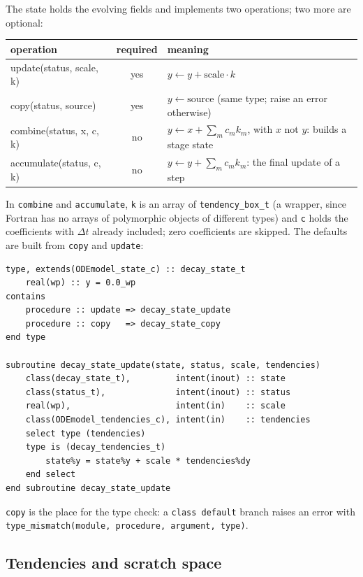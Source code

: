 \documentclass[11pt,a4paper]{article}
\newcommand{\dt}{\Delta t}
\newcommand{\code}[1]{\texttt{#1}}
\begin{document}
The state holds the evolving fields and implements two operations; two
more are optional:
\begin{center}
\renewcommand{\arraystretch}{1.25}
\begin{tabular}{>{\ttfamily}l c p{7.2cm}}
  \toprule
  \normalfont operation & required & meaning \\
  \midrule
  update(status, scale, k)       & yes & $y \leftarrow y + \text{scale}\cdot k$ \\
  copy(status, source)           & yes & $y \leftarrow \text{source}$ (same type; raise an error otherwise) \\
  combine(status, x, c, k)       & no  & $y \leftarrow x + \sum_m c_m k_m$, with $x$ not $y$: builds a stage state \\
  accumulate(status, c, k)       & no  & $y \leftarrow y + \sum_m c_m k_m$: the final update of a step \\
  \bottomrule
\end{tabular}
\end{center}
In \code{combine} and \code{accumulate}, \code{k} is an array of
\code{tendency\_box\_t} (a wrapper, since Fortran has no arrays of
polymorphic objects of different types) and \code{c} holds the coefficients
with $\dt$ already included; zero coefficients are skipped. The defaults are
built from \code{copy} and \code{update}:
\begin{lstlisting}
type, extends(ODEmodel_state_c) :: decay_state_t
    real(wp) :: y = 0.0_wp
contains
    procedure :: update => decay_state_update
    procedure :: copy   => decay_state_copy
end type

subroutine decay_state_update(state, status, scale, tendencies)
    class(decay_state_t),         intent(inout) :: state
    class(status_t),              intent(inout) :: status
    real(wp),                     intent(in)    :: scale
    class(ODEmodel_tendencies_c), intent(in)    :: tendencies
    select type (tendencies)
    type is (decay_tendencies_t)
        state%y = state%y + scale * tendencies%dy
    end select
end subroutine decay_state_update
\end{lstlisting}
\code{copy} is the place for the type check: a \code{class default} branch
raises an error with \code{type\_mismatch(module, procedure, argument, type)}.

\subsection{Tendencies and scratch space}
\end{document}
